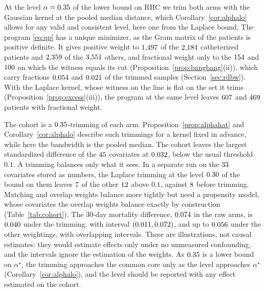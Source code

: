 At the level $\alpha=0.35$ of the lower bound on RHC we trim both arms with the Gaussian kernel at the pooled
median distance, which Corollary~\ref{cor:alphalo} allows for any valid and consistent level, here one from the Laplace bound. The program \eqref{eq:qp} has a unique minimizer, as
the Gram matrix of the patients is positive definite. It gives positive weight to $1{,}497$ of the $2{,}184$ catheterized patients and
$2{,}359$ of the $3{,}551$ others, and fractional weight only to the $154$ and $100$ on which the
witness equals its cut (Proposition~\ref{prop:bangbang}(ii)), which carry fractions $0.054$ and
$0.021$ of the trimmed samples (Section~\ref{sec:rdbw}). With the Laplace kernel, whose witness on the line
is flat on the set it trims (Proposition~\ref{prop:excess}(iii)), the program at the same level leaves $607$ and $469$ patients with fractional
weight.

The cohort is a $0.35$-trimming of each arm. Proposition~\ref{prop:alphahat} and Corollary~\ref{cor:alphalo}
describe such trimmings for a kernel fixed in advance, while here the bandwidth is the pooled median. The cohort leaves the
largest standardized difference of the $45$ covariates at $0.032$, below the usual threshold $0.1$.
A trimming balances only what it sees. In a separate run on the $33$ covariates stored as numbers, the
Laplace trimming at the level $0.30$ of the bound on them leaves $7$ of the other $12$ above $0.1$, against
$8$ before trimming. Matching and overlap weights balance more tightly but need a propensity model,
whose covariates the overlap weights balance exactly by construction (Table~\ref{tab:cohort}). The $30$-day mortality
difference, $0.074$ in the raw arms, is $0.040$ under the trimming, with interval $(0.011,0.072)$,
and up to $0.056$ under the other weightings, with overlapping intervals. These are illustrations, not causal
estimates: they would estimate effects only under no unmeasured confounding, and the intervals ignore the estimation of
the weights. As $0.35$ is a lower bound on $\alpha^\star$, the trimming approaches the common core only as the
level approaches $\alpha^\star$ (Corollary~\ref{cor:alphalo}), and the level should be reported with any effect
estimated on the cohort.
